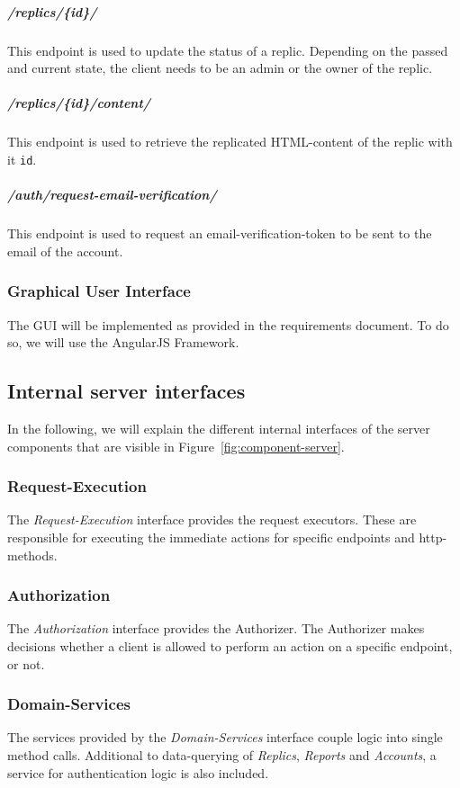 \subparagraph{/replics/\{id\}/} This endpoint is used to update the status of a replic.
Depending on the passed and current state, the client needs to be an admin or the owner of the replic.
\subparagraph{/replics/\{id\}/content/} This endpoint is used to retrieve the replicated HTML-content of the replic with it \texttt{id}.

\subparagraph{/auth/request-email-verification/} This endpoint is used to request an email-verification-token to be sent to the email of the account.

\subsubsection{Graphical User Interface}
The GUI will be implemented as provided in the requirements document.
To do so, we will use the AngularJS Framework.

\subsection{Internal server interfaces}\label{subsec:internal-server-interfaces}
In the following, we will explain the different internal interfaces of the server components that are visible in Figure~\ref{fig:component-server}.

\subsubsection{Request-Execution}
The \textit{Request-Execution} interface provides the request executors.
These are responsible for executing the immediate actions for specific endpoints and http-methods.

\subsubsection{Authorization}
The \textit{Authorization} interface provides the Authorizer.
The Authorizer makes decisions whether a client is allowed to perform an action on a specific endpoint, or not.

\subsubsection{Domain-Services}
The services provided by the \textit{Domain-Services} interface couple logic into single method calls.
Additional to data-querying of \textit{Replics}, \textit{Reports} and \textit{Accounts}, a service for authentication logic is also included.

